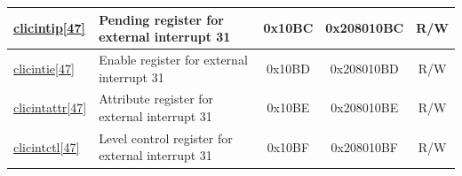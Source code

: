 \begin{longtable}{ | p{1.8cm} | p{7.5cm} | c | c | c | }
\hyperref[regdesc:MCLICINTIP_REG_i]{clicintip[47]} & Pending register for external interrupt 31 & 0x10BC & 0x208010BC & R/W \\\hline
\hyperref[regdesc:MCLICINTIE_REG_i]{clicintie[47]} & Enable register for external interrupt 31 & 0x10BD & 0x208010BD & R/W \\\hline
\hyperref[regdesc:MCLICINTATTR_REG_i]{clicintattr[47]} & Attribute register for external interrupt 31 & 0x10BE & 0x208010BE & R/W \\\hline
\hyperref[regdesc:MCLICINTCTL_REG_i]{clicintctl[47]} & Level control register for  external interrupt 31 & 0x10BF & 0x208010BF & R/W \\\hline

\end{longtable}
